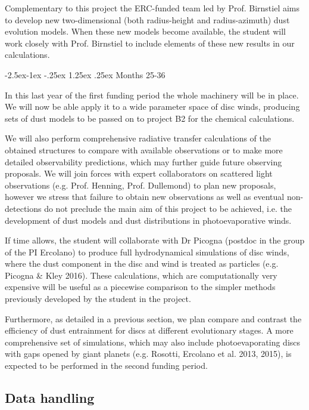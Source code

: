\documentclass[10pt,fleqn,twoside]{article}
\makeatletter
\newcommand{\Tcol}{\color{blue}}
\renewcommand\paragraph{\@startsection{paragraph}{4}{\z@}%
            {-2.5ex\@plus -1ex \@minus -.25ex}%
            {1.25ex \@plus .25ex}%
            {\normalfont\normalsize\bfseries}}
\makeatother
\begin{document}
Complementary to this project the ERC-funded team led by
Prof. Birnstiel aims to develop new two-dimensional (both
radius-height and radius-azimuth) dust evolution
models. When these new models become available, the student will work
closely with Prof. Birnstiel to include elements of these new results
in our calculations. 

\paragraph{Months 25-36}

In this last year of the first funding period the whole machinery will
be in place. We will now be able apply it to a wide parameter
space of disc winds, producing sets of dust models to be passed on to
project B2 for the chemical calculations. 

We will also perform comprehensive radiative transfer calculations of
the obtained structures to compare with available observations or to
make more detailed observability predictions, which may further guide
future observing proposals. We will join forces with expert
collaborators on scattered light observations (e.g. Prof. Henning,
Prof. Dullemond) to
plan new proposals, however we stress that failure to obtain new
observations as well as eventual non-detections do not preclude the
main aim of this project to be achieved, i.e. the development
of dust models and dust distributions in photoevaporative winds. 

If time allows, the student will collaborate with Dr Picogna (postdoc
in the group of the PI
Ercolano) to
produce full hydrodynamical simulations of disc winds, where the dust
component in the disc and wind is treated as particles (e.g. Picogna
\& Kley 2016). These calculations, which are computationally very expensive
will be useful as a piecewise comparison to the simpler methods previously
developed by the student in the project.  

Furthermore, as detailed in a previous section, we plan compare and contrast
the efficiency of dust entrainment for discs at different evolutionary
stages. A more comprehensive set of simulations, which may also include
photoevaporating discs with gaps opened by giant planets
(e.g. Rosotti, Ercolano et al. 2013, 2015), is expected to be
performed in the second funding period. 

\vspace{0.5em}


\subsection{\Tcol Data handling}
\end{document}
